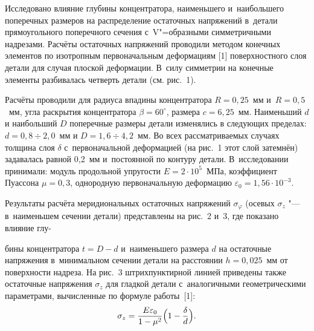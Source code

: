 

\date{02/III/2010}


\maketitle \small






Исследовано влияние глубины концентратора, наименьшего и~наибольшего  поперечных размеров на распределение остаточных напряжений в~детали прямоугольного поперечного сечения с~V"=образными симметричными надрезами. 
Расчёты остаточных напряжений проводили методом конечных элементов по изотропным первоначальным деформациям [1] поверхностного слоя детали для случая плоской деформации. 
В~силу симметрии на конечные элементы разбивалась четверть детали (см. рис.~1).

Расчёты проводили для радиуса впадины концентратора $R=0,25$~мм и~$R=0,5$~мм, угла раскрытия концентратора $\beta =60^\circ$, размера  $c=6,25$~мм. Наименьший $d$ и наибольший $D$ поперечные размеры детали изменялись в следующих пределах: $d=0,8\div 2,0$~мм и $D=1,6\div4,2$~мм. 
Во всех  рассматриваемых случаях толщина слоя $\delta $ с~первоначальной деформацией (на рис.~1 этот слой затемнён) задавалась равной 0,2~мм и~постоянной по контуру детали. 
В~исследовании принимали: модуль продольной упругости $E=2\cdot 10^5$~МПа, коэффициент Пуассона $\mu =0,3$, однородную первоначальную деформацию $\varepsilon _0 =1,56\cdot 10^{-3}$.

Результаты расчёта меридиональных остаточных напряжений $\sigma _\varphi $ (осевых $\sigma_z$ "--- в~наименьшем сечении детали) представлены на рис.~2 и~3, где показано влияние глу- \linebreak 






\noindent 
бины концентратора $t=D-d$ и~наименьшего размера $d$ на остаточные напряжения 
в~минимальном сечении детали на расстоянии $h=0,025$~мм от поверхности надреза. 
На рис.~3 штрихпунктирной линией приведены также остаточные напряжения $\sigma _z $ для гладкой детали с~аналогичными геометрическими параметрами, вычисленные по формуле работы~[1]: 
\begin{equation}
\label{vak:eq1}
\sigma _z =\frac{ E \varepsilon _0 }{1-\mu ^2} \Bigl( 1-\frac \delta d \Bigr).
\end{equation}





